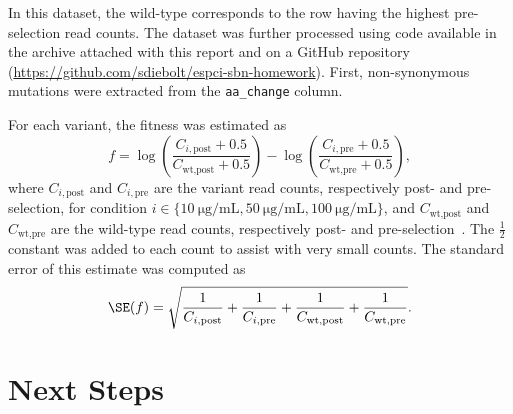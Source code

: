 \documentclass[12pt]{article}
\begin{document}
  In this dataset, the wild-type corresponds to the row having the highest
  pre-selection read counts. The dataset was further processed using code
  available in the archive attached with this report and on a GitHub repository
  (\url{https://github.com/sdiebolt/espci-sbn-homework}). First, non-synonymous
  mutations were extracted from the \lstinline{aa_change} column. 

  For each variant, the fitness was estimated as 
  \begin{equation}
    f = \log\left(\frac{C_{i, \text{post}} + 0.5}{C_{\text{wt}, \text{post}} +
    0.5}\right) - 
    \log\left(\frac{C_{i, \text{pre}} + 0.5}{C_{\text{wt}, \text{pre}} +
    0.5}\right),
  \end{equation}
  where $C_{i, \text{post}}$ and $C_{i, \text{pre}}$ are the variant read
  counts, respectively post- and pre-selection, for condition
  $i\in\{\SI{10}{\micro\gram\per\milli\liter},
  \SI{50}{\micro\gram\per\milli\liter},
  \SI{100}{\micro\gram\per\milli\liter}\}$, and $C_{\text{wt}, \text{post}}$
  and $C_{\text{wt}, \text{pre}}$ are the wild-type read counts, respectively
  post- and pre-selection~\cite{rubin2017}. The $\frac{1}{2}$ constant was
  added to each count to assist with very small counts. The standard error of
  this estimate was computed as
  \begin{equation}
    \SE(f) = \sqrt{\frac{1}{C_{i, \text{post}}} + \frac{1}{C_{i, \text{pre}}} +
    \frac{1}{C_{\text{wt}, \text{post}}} + \frac{1}{C_{\text{wt},
    \text{pre}}}}.
  \end{equation}

  \section*{Next Steps}



  \newpage

  
  
\end{document}
